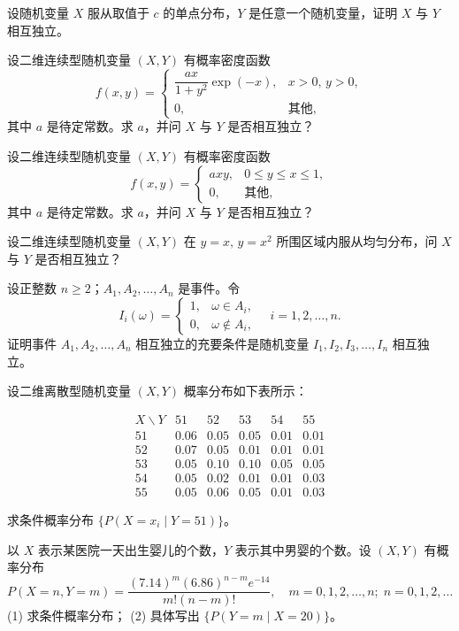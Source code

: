 \begin{homework}[2.31]
设随机变量 $X$ 服从取值于 $c$ 的单点分布，$Y$ 是任意一个随机变量，证明 $X$ 与 $Y$ 相互独立。
\end{homework}

\begin{homework}[2.32]
设二维连续型随机变量 $(X,Y)$ 有概率密度函数
\[
f(x,y) =
\begin{cases}
\dfrac{a x}{1+y^2} \exp(-x), & x > 0, \, y > 0, \\[6pt]
0, & \text{其他},
\end{cases}
\]
其中 $a$ 是待定常数。求 $a$，并问 $X$ 与 $Y$ 是否相互独立？
\end{homework}

\begin{homework}[2.33]
设二维连续型随机变量 $(X,Y)$ 有概率密度函数
\[
f(x,y) =
\begin{cases}
a x y, & 0 \leq y \leq x \leq 1, \\[6pt]
0, & \text{其他},
\end{cases}
\]
其中 $a$ 是待定常数。求 $a$，并问 $X$ 与 $Y$ 是否相互独立？
\end{homework}

\begin{homework}[2.34]
设二维连续型随机变量 $(X,Y)$ 在 $y=x, \, y=x^2$ 所围区域内服从均匀分布，问 $X$ 与 $Y$ 是否相互独立？
\end{homework}

\begin{homework}[2.35]
设正整数 $n \geq 2$；$A_1, A_2, \ldots, A_n$ 是事件。令
\[
I_i(\omega) =
\begin{cases}
1, & \omega \in A_i, \\[6pt]
0, & \omega \notin A_i,
\end{cases}
\quad i=1,2,\ldots,n.
\]
证明事件 $A_1, A_2, \ldots, A_n$ 相互独立的充要条件是随机变量 $I_1, I_2, I_3, \ldots, I_n$ 相互独立。
\end{homework}

\begin{homework}[2.36]
设二维离散型随机变量 $(X,Y)$ 概率分布如下表所示：

\[
\begin{array}{c|ccccc}
X \backslash Y & 51 & 52 & 53 & 54 & 55 \\ \hline
51 & 0.06 & 0.05 & 0.05 & 0.01 & 0.01 \\
52 & 0.07 & 0.05 & 0.01 & 0.01 & 0.01 \\
53 & 0.05 & 0.10 & 0.10 & 0.05 & 0.05 \\
54 & 0.05 & 0.02 & 0.01 & 0.01 & 0.03 \\
55 & 0.05 & 0.06 & 0.05 & 0.01 & 0.03
\end{array}
\]

求条件概率分布 $\{ P(X = x_i \mid Y = 51) \}$。
\end{homework}
\begin{homework}[2.37]
以 $X$ 表示某医院一天出生婴儿的个数，$Y$ 表示其中男婴的个数。设 $(X,Y)$ 有概率分布
\[
P(X = n, Y = m) = \frac{(7.14)^m (6.86)^{n-m} e^{-14}}{m!(n-m)!}, 
\quad m = 0,1,2,\ldots,n; \; n = 0,1,2,\ldots
\]
(1) 求条件概率分布；  
(2) 具体写出 $\{ P(Y = m \mid X = 20) \}$。
\end{homework}

